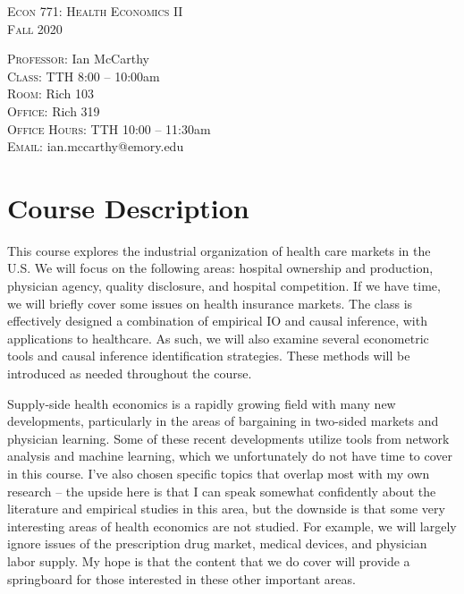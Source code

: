 \documentclass{article}
\begin{document}
\thispagestyle{empty}

\vspace{-.5in}

\begin{center}
\textsc{\Large{Econ 771: Health Economics II}} \\
\textsc{\large{Fall 2020}}
\end{center}

\noindent \textsc{Professor:} Ian McCarthy\\
\noindent \textsc{Class:} TTH 8:00 -- 10:00am \\
\noindent \textsc{Room:} Rich 103 \\
\noindent \textsc{Office:} Rich 319 \\
\noindent \textsc{Office Hours:} TTH 10:00 -- 11:30am \\
\noindent \textsc{Email:} ian.mccarthy@emory.edu \\

\vspace{-.25in}

\section*{Course Description}
This course explores the industrial organization of health care markets in the U.S. We will focus on the following areas: hospital ownership and production, physician agency, quality disclosure, and hospital competition. If we have time, we will briefly cover some issues on health insurance markets. The class is effectively designed a combination of empirical IO and causal inference, with applications to healthcare. As such, we will also examine several econometric tools and causal inference identification strategies. These methods will be introduced as needed throughout the course.

Supply-side health economics is a rapidly growing field with many new developments, particularly in the areas of bargaining in two-sided markets and physician learning. Some of these recent developments utilize tools from network analysis and machine learning, which we unfortunately do not have time to cover in this course. I've also chosen specific topics that overlap most with my own research -- the upside here is that I can speak somewhat confidently about the literature and empirical studies in this area, but the downside is that some very interesting areas of health economics are not studied. For example, we will largely ignore issues of the prescription drug market, medical devices, and physician labor supply. My hope is that the content that we do cover will provide a springboard for those interested in these other important areas.
\end{document}
